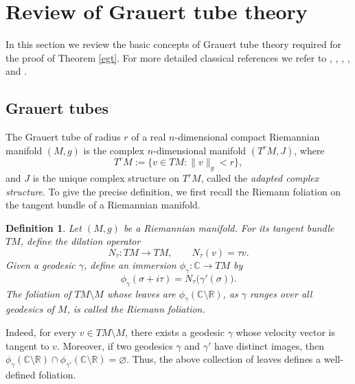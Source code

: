 \documentclass[a4paper, 12pt]{article}
\newtheorem{thm}{Theorem}[section]
\newtheorem{defn}[thm]{Definition}
\begin{document}

\section{Review of Grauert tube theory}

In this section we review the basic concepts of Grauert tube theory required for the proof of Theorem \ref{egt}. For more detailed classical references we refer to \cite{LS91}, \cite{S91}, \cite{GS91}, \cite{BK77}, and \cite{BHH03}.
\subsection{Grauert tubes}
The Grauert tube of radius $r$ of a real $n$-dimensional compact Riemannian manifold $(M,g)$ is the complex $n$-dimensional manifold $(T^rM,J)$, where
\[
T^rM:=\{v\in TM:\|v\|_g<r\},
\]
and $J$ is the unique complex structure on $T^rM$, called the \emph{adapted complex structure}. To give the precise definition, we first recall the Riemann foliation on the tangent bundle of a Riemannian manifold.

\begin{defn}\label{rf}
Let $(M,g)$ be a Riemannian manifold. For its tangent bundle $TM$, define the dilation operator
\[
N_\tau:TM\longrightarrow TM,\qquad N_\tau(v)=\tau v.
\]
Given a geodesic $\gamma$, define an immersion $\phi_\gamma:\mathbb{C}\longrightarrow TM$ by
\[
\phi_\gamma(\sigma+i\tau)=N_\tau\bigl(\gamma'(\sigma)\bigr).
\]
The foliation of $TM\setminus M$ whose leaves are $\phi_\gamma(\mathbb{C}\setminus\mathbb{R})$, as $\gamma$ ranges over all geodesics of $M$, is called the \emph{Riemann foliation}.
\end{defn}

Indeed, for every $v\in TM\setminus M$, there exists a geodesic $\gamma$ whose velocity vector is tangent to $v$. Moreover, if two geodesics $\gamma$ and $\gamma'$ have distinct images, then $\phi_\gamma(\mathbb{C}\setminus\mathbb{R})\cap\phi_{\gamma'}(\mathbb{C}\setminus\mathbb{R})=\varnothing$. Thus, the above collection of leaves defines a well-defined foliation.
\end{document}

